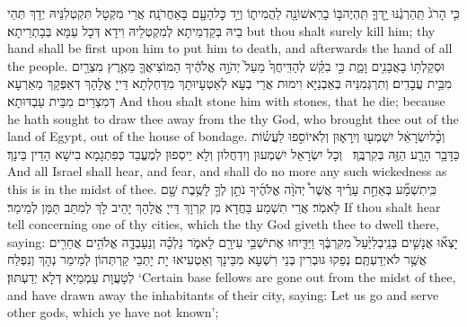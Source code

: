 {כִּ֤י הָרֹג֙ תַּֽהַרְגֶ֔נּוּ יָ֥דְךָ֛ תִּֽהְיֶה\maqqaf בּ֥וֹ בָרִֽאשׁוֹנָ֖ה לַהֲמִית֑וֹ וְיַ֥ד כׇּל\maqqaf הָעָ֖ם בָּאַחֲרֹנָֽה׃}
{אֲרֵי מִקְטָל תִּקְטְלִנֵּיהּ יְדָךְ תְּהֵי בֵיהּ בְּקַדְמֵיתָא לְמִקְטְלֵיהּ וִידָא דְּכָל עַמָּא בְּבָתְרֵיתָא׃}
{but thou shalt surely kill him; thy hand shall be first upon him to put him to death, and afterwards the hand of all the people.}{}
{וּסְקַלְתּ֥וֹ בָאֲבָנִ֖ים וָמֵ֑ת כִּ֣י בִקֵּ֗שׁ לְהַדִּֽיחֲךָ֙ מֵעַל֙ יְהֹוָ֣ה אֱלֹהֶ֔יךָ הַמּוֹצִיאֲךָ֛ מֵאֶ֥רֶץ מִצְרַ֖יִם מִבֵּ֥ית עֲבָדִֽים׃}
{וְתִרְגְּמִנֵּיהּ בְּאַבְנַיָּא וִימוּת אֲרֵי בְעָא לְאַטְעָיוּתָךְ מִדַּחְלְתָא דַּייָ אֱלָהָךְ דְּאַפְּקָךְ מֵאַרְעָא דְּמִצְרַיִם מִבֵּית עַבְדּוּתָא׃}
{And thou shalt stone him with stones, that he die; because he hath sought to draw thee away from the \lord\space thy God, who brought thee out of the land of Egypt, out of the house of bondage.}{}
{וְכׇ֨ל\maqqaf יִשְׂרָאֵ֔ל יִשְׁמְע֖וּ וְיִֽרָא֑וּן וְלֹֽא\maqqaf יוֹסִ֣פוּ לַעֲשׂ֗וֹת כַּדָּבָ֥ר הָרָ֛ע הַזֶּ֖ה בְּקִרְבֶּֽךָ׃ \setuma }
{וְכָל יִשְׂרָאֵל יִשְׁמְעוּן וְיִדְחֲלוּן וְלָא יֵיסְפוּן לְמֶעֱבַד כְּפִתְגָמָא בִישָׁא הָדֵין בֵּינָךְ׃}
{And all Israel shall hear, and fear, and shall do no more any such wickedness as this is in the midst of thee.}{}
{כִּֽי\maqqaf תִשְׁמַ֞ע בְּאַחַ֣ת עָרֶ֗יךָ אֲשֶׁר֩ יְהֹוָ֨ה אֱלֹהֶ֜יךָ נֹתֵ֥ן לְךָ֛ לָשֶׁ֥בֶת שָׁ֖ם לֵאמֹֽר׃}
{אֲרֵי תִשְׁמַע בַּחֲדָא מִן קִרְוָךְ דַּייָ אֱלָהָךְ יָהֵיב לָךְ לְמִתַּב תַּמָּן לְמֵימַר׃}
{If thou shalt hear tell concerning one of thy cities, which the \lord\space thy God giveth thee to dwell there, saying:}{}
{יָצְא֞וּ אֲנָשִׁ֤ים בְּנֵֽי\maqqaf בְלִיַּ֙עַל֙ מִקִּרְבֶּ֔ךָ וַיַּדִּ֛יחוּ אֶת\maqqaf יֹשְׁבֵ֥י עִירָ֖ם לֵאמֹ֑ר נֵלְכָ֗ה וְנַעַבְדָ֛ה אֱלֹהִ֥ים אֲחֵרִ֖ים אֲשֶׁ֥ר לֹא\maqqaf יְדַעְתֶּֽם׃}
{נְפַקוּ גּוּבְרִין בְּנֵי רִשְׁעָא מִבֵּינָךְ וְאַטְעִיאוּ יָת יָתְבֵי קַרְתְּהוֹן לְמֵימַר נְהָךְ וְנִפְלַח לְטָעֲוָת עַמְמַיָּא דְּלָא יְדַעְתּוּן׃}
{‘Certain base fellows are gone out from the midst of thee, and have drawn away the inhabitants of their city, saying: Let us go and serve other gods, which ye have not known’;}{}
